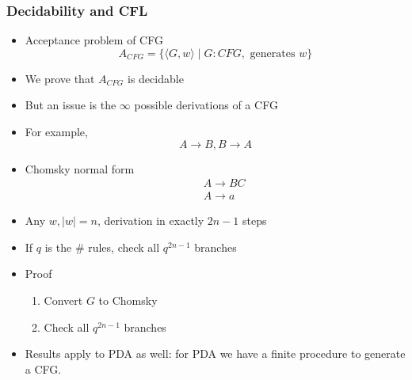 




\begin{frame}[allowframebreaks] \frametitle{Decidability and CFL}
  \begin{itemize}
\item Acceptance problem of CFG
  \begin{equation*}
    A_{CFG}
=\{\langle  G,w\rangle \mid
G: CFG,\mbox{ generates } w\}
  \end{equation*}
\item We prove that $A_{CFG}$ is decidable
\item But an issue is the $\infty$ possible derivations of a CFG

\item For example,
  \begin{equation*}
  A\rightarrow B, B \rightarrow A
\end{equation*}

\item Chomsky normal form
  \begin{eqnarray*}
    && A \rightarrow BC\\
&& A \rightarrow a
  \end{eqnarray*}

\item Any $w, |w|=n$, derivation in 
exactly $2n-1$ steps

\item If $q$ is the \# rules, check all $q^{2n-1}$ branches

\item Proof
  \begin{enumerate}
  \item Convert $G$ to Chomsky
  \item Check all $q^{2n-1}$ branches
  \end{enumerate}

\item Results apply to PDA as well: for PDA we have a finite
  procedure to generate a CFG.
\end{itemize}\end{frame}

